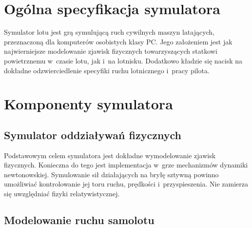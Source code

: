 \documentclass{mwrep}
\begin{document}
\section{Ogólna specyfikacja symulatora}

Symulator lotu jest grą symulującą ruch cywilnych maszyn latających, przeznaczoną dla komputerów osobistych klasy PC. Jego założeniem jest jak najwierniejsze modelowanie zjawisk fizycznych towarzyszących statkowi powietrznemu w~czasie lotu, jak i~na lotnisku. Dodatkowo kładzie się nacisk na dokładne odzwierciedlenie specyfiki ruchu lotnicznego i~pracy pilota.

\section{Komponenty symulatora}

\subsection{Symulator oddziaływań fizycznych}

Podstawowym celem symulatora jest dokładne wymodelowanie zjawisk fizycznych. Konieczna do tego jest implementacja w~grze mechanizmów dynamiki newtonowskiej. Symulowanie sił działających na bryłę sztywną powinno umożliwiać kontrolowanie jej toru ruchu, prędkości i~przyspieszenia. Nie zamierza się uwzględniać fizyki relatywistycznej.

\subsection{Modelowanie ruchu samolotu}
\end{document}
